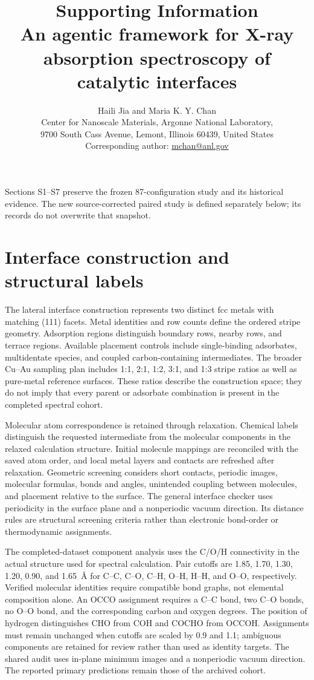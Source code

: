\documentclass[11pt,a4paper]{article}
\title{Supporting Information\\[0.5em]\large An agentic framework for X-ray absorption spectroscopy of catalytic interfaces}
\author{Haili Jia and Maria K. Y. Chan\\[0.5em]
\small Center for Nanoscale Materials, Argonne National Laboratory,\\
\small 9700 South Cass Avenue, Lemont, Illinois 60439, United States\\
\small Corresponding author: \href{mailto:mchan@anl.gov}{mchan@anl.gov}}
\date{}
\begin{document}
\maketitle
\noindent Sections S1--S7 preserve the frozen 87-configuration study and its historical evidence. The new source-corrected paired study is defined separately below; its records do not overwrite that snapshot.
\section{Interface construction and structural labels}
The lateral interface construction represents two distinct fcc metals with matching (111) facets. Metal identities and row counts define the ordered stripe geometry. Adsorption regions distinguish boundary rows, nearby rows, and terrace regions. Available placement controls include single-binding adsorbates, multidentate species, and coupled carbon-containing intermediates. The broader Cu--Au sampling plan includes 1:1, 2:1, 1:2, 3:1, and 1:3 stripe ratios as well as pure-metal reference surfaces. These ratios describe the construction space; they do not imply that every parent or adsorbate combination is present in the completed spectral cohort.

Molecular atom correspondence is retained through relaxation. Chemical labels distinguish the requested intermediate from the molecular components in the relaxed calculation structure. Initial molecule mappings are reconciled with the saved atom order, and local metal layers and contacts are refreshed after relaxation. Geometric screening considers short contacts, periodic images, molecular formulas, bonds and angles, unintended coupling between molecules, and placement relative to the surface. The general interface checker uses periodicity in the surface plane and a nonperiodic vacuum direction. Its distance rules are structural screening criteria rather than electronic bond-order or thermodynamic assignments.

The completed-dataset component analysis uses the C/O/H connectivity in the actual structure used for spectral calculation. Pair cutoffs are 1.85, 1.70, 1.30, 1.20, 0.90, and 1.65~\AA{} for C--C, C--O, C--H, O--H, H--H, and O--O, respectively. Verified molecular identities require compatible bond graphs, not elemental composition alone. An OCCO assignment requires a C--C bond, two C--O bonds, no O--O bond, and the corresponding carbon and oxygen degrees. The position of hydrogen distinguishes CHO from COH and COCHO from OCCOH. Assignments must remain unchanged when cutoffs are scaled by 0.9 and 1.1; ambiguous components are retained for review rather than used as identity targets. The shared audit uses in-plane minimum images and a nonperiodic vacuum direction. The reported primary predictions remain those of the archived cohort.
\end{document}
